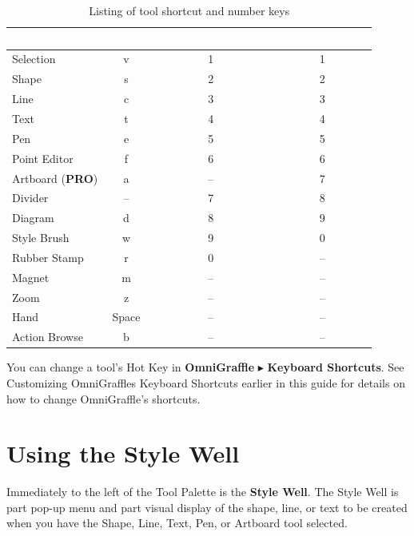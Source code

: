 \documentclass[../main.tex]{subfiles}
\begin{document}
\begingroup
\small
\setlength{\LTleft}{0.075\textwidth}
\setlength{\LTright}{0.075\textwidth}
\renewcommand{\arraystretch}{1.25}
\begin{xltabular}{0.85\textwidth}{|l|c|c|c|}
  \caption{Listing of tool shortcut and number keys}\\
  \hline
  \textcolor{white}{\textbf{Tool}} & \textcolor{white}{\textbf{Letter}} &
  \textcolor{white}{\textbf{Number (Standard)}} & \textcolor{white}{\textbf{Number (PRO)}}
  \\
  \hline
  \endhead
  \hline
  \endfoot
  Selection & v & 1 & 1 \\
  \hline
  Shape & s & 2 & 2 \\
  \hline
  Line & c & 3 & 3 \\
  \hline
  Text & t & 4 & 4 \\
  \hline
  Pen & e & 5 & 5 \\
  \hline
  Point Editor & f & 6 & 6 \\
  \hline
  Artboard (\textbf{PRO}) & a & -- & 7 \\
  \hline
  Divider & -- & 7 & 8 \\
  \hline
  Diagram & d & 8 & 9 \\
  \hline
  Style Brush & w & 9 & 0 \\
  \hline
  Rubber Stamp & r & 0 & -- \\
  \hline
  Magnet & m & -- & -- \\
  \hline
  Zoom & z & -- & -- \\
  \hline
  Hand & Space & -- & -- \\
  \hline
  Action Browse & b & -- & -- \\
  \hline
\end{xltabular}
\endgroup

You can change a tool's Hot Key in \textbf{OmniGraffle} $\blacktriangleright$ \textbf{Keyboard
Shortcuts}. See Customizing OmniGraffles Keyboard Shortcuts earlier in this guide for details
on how to change OmniGraffle's shortcuts.

\section{Using the Style Well}


Immediately to the left of the Tool Palette is the \textbf{Style Well}. The Style Well is part
pop-up menu and part visual display of the shape, line, or text to be created when you have
the Shape, Line, Text, Pen, or Artboard tool selected.
\end{document}
